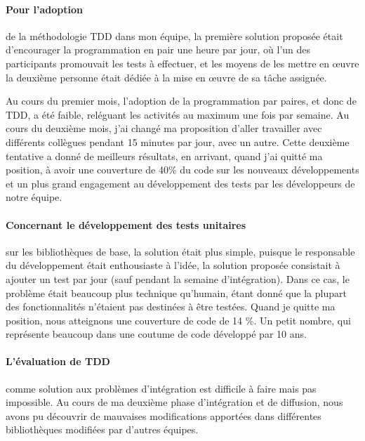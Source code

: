 \documentclass{resume} %
\begin{document}
\paragraph {Pour l'adoption} de la méthodologie TDD dans mon équipe, la première solution proposée était d'encourager la programmation en pair une heure par jour, où l'un des participants promouvait les tests à effectuer, et les moyens de les mettre en œuvre la deuxième personne était dédiée à la mise en œuvre de sa tâche assignée.

Au cours du premier mois, l'adoption de la programmation par paires, et donc de TDD, a été faible, reléguant les activités au maximum une fois par semaine.
Au cours du deuxième mois, j'ai changé ma proposition d'aller travailler avec différents collègues pendant 15 minutes par jour, avec un autre.
Cette deuxième tentative a donné de meilleurs résultats, en arrivant, quand j'ai quitté ma position, à avoir une couverture de 40\% du code sur les nouveaux développements et un plus grand engagement au développement des tests par les développeurs de notre équipe.

\paragraph {Concernant le développement des tests unitaires} sur les bibliothèques  de base, la solution était plus simple, puisque le responsable du développement était enthousiaste à l'idée, la solution proposée consistait à ajouter un test par jour (sauf pendant la semaine d'intégration).
Dans ce cas, le problème était beaucoup plus technique qu'humain, étant donné que la plupart des fonctionnalités n'étaient pas destinées à être testées.
Quand je quitte ma position, nous atteignons une couverture de code de 14 \%. Un petit nombre, qui représente beaucoup dans une coutume de code développé par 10 ans.

\paragraph {L'évaluation de TDD} comme solution aux problèmes d'intégration est difficile à faire mais pas impossible. Au cours de ma deuxième phase d'intégration et de diffusion, nous avons pu découvrir de mauvaises modifications apportées dans différentes bibliothèques modifiées par d'autres équipes.
\end{document}
